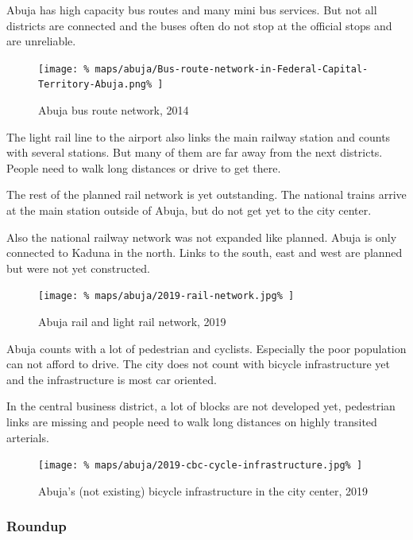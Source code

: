 \documentclass{article}
\begin{document}
\begin{multicols}{2}
			Abuja has high capacity bus routes and many mini bus services. But not all districts are connected and the buses often do not stop at the official stops and are unreliable.
			
			\begin{figure}[H]
				\texttt{[image: \%
					maps/abuja/Bus-route-network-in-Federal-Capital-Territory-Abuja.png\%
				]}
				\caption{Abuja bus route network, 2014  \cite{ResearchGate:AbujaBusRouteNetwork}}
				\label{fig:map:abuja-bus-route-network}
			\end{figure}
			
			The light rail line to the airport also links the main railway station and counts with several stations. But many of them are far away from the next districts. People need to walk long distances or drive to get there.
			
			The rest of the planned rail network is yet outstanding. The national trains arrive at the main station outside of Abuja, but do not get yet to the city center.
			
			Also the national railway network was not expanded like planned. Abuja is only connected to Kaduna in the north. Links to the south, east and west are planned but were not yet constructed.
			
			\begin{figure}[H]
				\texttt{[image: \%
					maps/abuja/2019-rail-network.jpg\%
				]}
				\caption{Abuja rail and light rail network, 2019  \cite{ResearchGate:AbujaBusRouteNetwork}}
				\label{fig:map:abuja-rail-network-2019}
			\end{figure}
			
			Abuja counts with a lot of pedestrian and cyclists. Especially the poor population can not afford to drive.
			The city does not count with bicycle infrastructure yet and the infrastructure is most car oriented.
			
			In the central business district, a lot of blocks are not developed yet, pedestrian links are missing and people need to walk long distances on highly transited arterials.
			
			\begin{figure}[H]
				\texttt{[image: \%
					maps/abuja/2019-cbc-cycle-infrastructure.jpg\%
				]}
				\caption{Abuja's (not existing) bicycle infrastructure in the city center, 2019 \cite{OpenCycleMap:Abuja}}
				\label{fig:map:abuja-bicycle-map-2019}
			\end{figure}	
			
			
			\subsubsection{Roundup}
			

\end{multicols}
\end{document}
